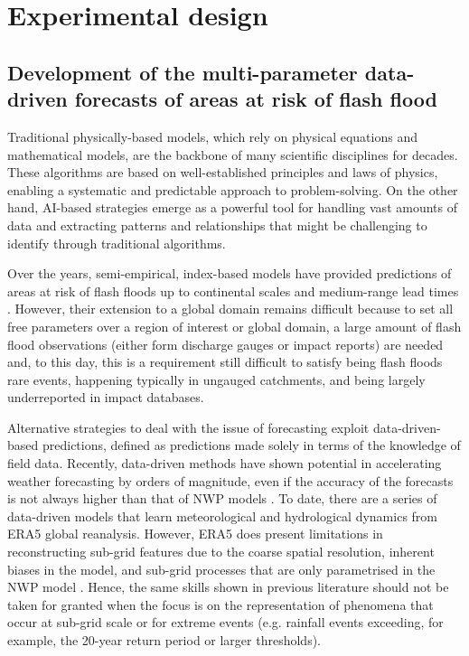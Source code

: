\chapter{Experimental design}
\label{experimental_design}
\graphicspath{{chapter_03/figures}{chapter_03/tables}}





\section{Development of the multi-parameter data-driven forecasts of areas at risk of flash flood}

Traditional physically-based models, which rely on physical equations and mathematical models, are the backbone of many scientific disciplines for decades. These algorithms are based on well-established principles and laws of physics, enabling a systematic and predictable approach to problem-solving. On the other hand, AI-based strategies emerge as a powerful tool for handling vast amounts of data and extracting patterns and relationships that might be challenging to identify through traditional algorithms.

Over the years, semi-empirical, index-based models have provided predictions of areas at risk of flash floods up to continental scales \citep{Ma_2021} and medium-range lead times \citep{Alfieri_2015a, Raynaud_2015}. However, their extension to a global domain remains difficult because to set all free parameters over a region of interest or global domain, a large amount of flash flood observations (either form discharge gauges or impact reports) are needed and, to this day, this is a requirement still difficult to satisfy being flash floods rare events, happening typically in ungauged catchments, and being largely underreported in impact databases. 

Alternative strategies to deal with the issue of forecasting exploit data-driven-based predictions, defined as predictions made solely in terms of the knowledge of field data. Recently, data-driven methods have shown potential in accelerating weather forecasting by orders of magnitude, even if the accuracy of the forecasts is not always higher than that of NWP models \citep{Bauer_2021}. To date, there are a series of data-driven models that learn meteorological \citep{Lang_2024} and hydrological \citep{Nearing_2024} dynamics from ERA5 global reanalysis. However, ERA5 does present limitations in reconstructing sub-grid features due to the coarse spatial resolution, inherent biases in the model, and sub-grid processes that are only parametrised in the NWP model \citep{Pillosu_2025a}. Hence, the same skills shown in previous literature should not be taken for granted when the focus is on the representation of phenomena that occur at sub-grid scale or for extreme events (e.g. rainfall events exceeding, for example, the 20-year return period or larger thresholds).

